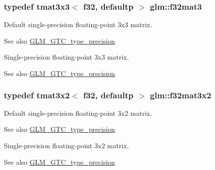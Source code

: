 \subsubsection[{f32mat3}]{\setlength{\rightskip}{0pt plus 5cm}typedef tmat3x3$<$ f32, defaultp $>$ {\bf glm\+::f32mat3}}\label{group__gtc__type__precision_ga5fbaec59b220964f59403bb362b5f93e}
Default single-\/precision floating-\/point 3x3 matrix. \begin{DoxySeeAlso}{See also}
\hyperlink{group__gtc__type__precision}{G\+L\+M\+\_\+\+G\+T\+C\+\_\+type\+\_\+precision}
\end{DoxySeeAlso}
Single-\/precision floating-\/point 3x3 matrix. \begin{DoxySeeAlso}{See also}
\hyperlink{group__gtc__type__precision}{G\+L\+M\+\_\+\+G\+T\+C\+\_\+type\+\_\+precision} 
\end{DoxySeeAlso}
\hypertarget{group__gtc__type__precision_ga61653615c76194cdf3454e6e703525e0}{}
\subsubsection[{f32mat3x2}]{\setlength{\rightskip}{0pt plus 5cm}typedef tmat3x2$<$ f32, defaultp $>$ {\bf glm\+::f32mat3x2}}\label{group__gtc__type__precision_ga61653615c76194cdf3454e6e703525e0}
Default single-\/precision floating-\/point 3x2 matrix. \begin{DoxySeeAlso}{See also}
\hyperlink{group__gtc__type__precision}{G\+L\+M\+\_\+\+G\+T\+C\+\_\+type\+\_\+precision}
\end{DoxySeeAlso}
Single-\/precision floating-\/point 3x2 matrix. \begin{DoxySeeAlso}{See also}
\hyperlink{group__gtc__type__precision}{G\+L\+M\+\_\+\+G\+T\+C\+\_\+type\+\_\+precision} 
\end{DoxySeeAlso}
\hypertarget{group__gtc__type__precision_ga715b36ea1e2d1ffaaef7517cc78b3877}{}
